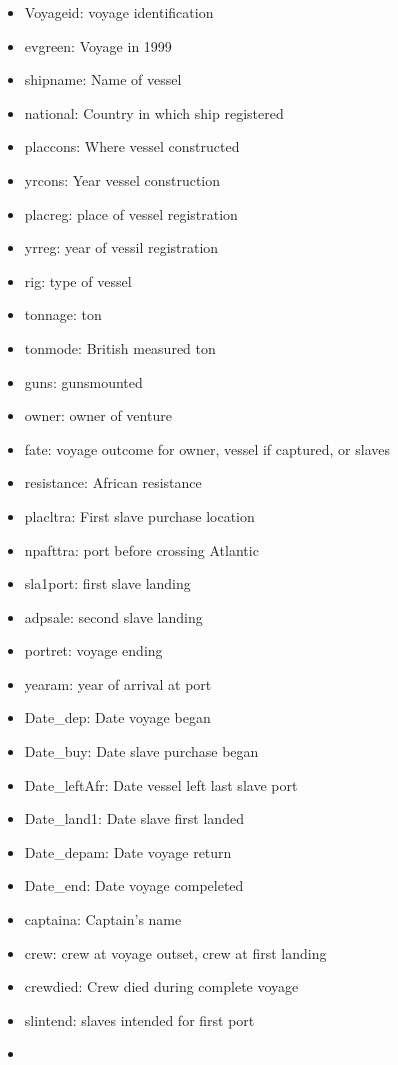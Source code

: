 \documentclass[11pt]{article}
\begin{document}
    \begin{itemize}
\item
  Voyageid: voyage identification
\item
  evgreen: Voyage in 1999
\item
  shipname: Name of vessel
\item
  national: Country in which ship registered
\item
  placcons: Where vessel constructed
\item
  yrcons: Year vessel construction
\item
  placreg: place of vessel registration
\item
  yrreg: year of vessil registration
\item
  rig: type of vessel
\item
  tonnage: ton
\item
  tonmode: British measured ton
\item
  guns: gunsmounted
\item
  owner: owner of venture
\item
  fate: voyage outcome for owner, vessel if captured, or slaves
\item
  resistance: African resistance
\item
  placltra: First slave purchase location
\item
  npafttra: port before crossing Atlantic
\item
  sla1port: first slave landing
\item
  adpsale: second slave landing
\item
  portret: voyage ending
\item
  yearam: year of arrival at port
\item
  Date\_dep: Date voyage began
\item
  Date\_buy: Date slave purchase began
\item
  Date\_leftAfr: Date vessel left last slave port
\item
  Date\_land1: Date slave first landed
\item
  Date\_depam: Date voyage return
\item
  Date\_end: Date voyage compeleted
\item
  captaina: Captain's name
\item
  crew: crew at voyage outset, crew at first landing
\item
  crewdied: Crew died during complete voyage
\item
  slintend: slaves intended for first port
\item

\end{itemize}
\end{document}
